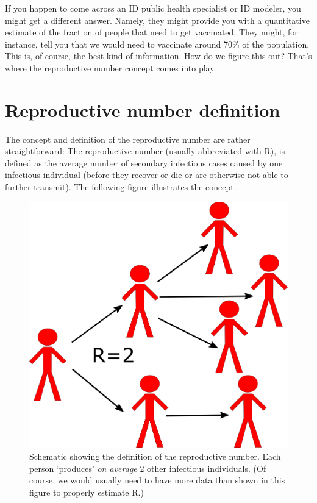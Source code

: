 \documentclass[]{book}
\theoremstyle{definition}
\theoremstyle{definition}
\theoremstyle{definition}
\theoremstyle{remark}
\begin{document}
If you happen to come across an ID public health specialist or ID
modeler, you might get a different answer. Namely, they might provide
you with a quantitative estimate of the fraction of people that need to
get vaccinated. They might, for instance, tell you that we would need to
vaccinate around 70\% of the population. This is, of course, the best
kind of information. How do we figure this out? That's where the
reproductive number concept comes into play.

\section{Reproductive number
definition}\label{reproductive-number-definition}

The concept and definition of the reproductive number are rather
straightforward: The reproductive number (usually abbreviated with R),
is defined as the average number of secondary infectious cases caused by
one infectious individual (before they recover or die or are otherwise
not able to further transmit). The following figure illustrates the
concept.

\begin{figure}
\centering
\includegraphics{./images/R0scheme.png}
\caption{Schematic showing the definition of the reproductive number.
Each person `produces' \emph{on average} 2 other infectious individuals.
(Of course, we would usually need to have more data than shown in this
figure to properly estimate R.)}
\end{figure}
\end{document}

